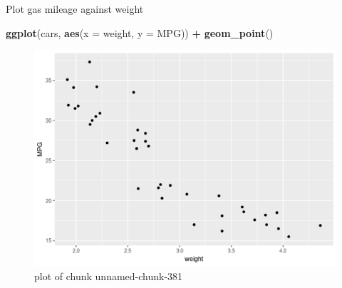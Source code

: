 \documentclass[ignorenonframetext,]{beamer}
\newenvironment{Shaded}{\begin{snugshade}}{\end{snugshade}}
\newcommand{\DataTypeTok}[1]{\textcolor[rgb]{0.13,0.29,0.53}{#1}}
\newcommand{\KeywordTok}[1]{\textcolor[rgb]{0.13,0.29,0.53}{\textbf{#1}}}
\newcommand{\NormalTok}[1]{#1}
\newcommand{\OperatorTok}[1]{\textcolor[rgb]{0.81,0.36,0.00}{\textbf{#1}}}
\newcommand{\StringTok}[1]{\textcolor[rgb]{0.31,0.60,0.02}{#1}}
\begin{document}
\begin{frame}[fragile]{Plot gas mileage against weight}
\protect\hypertarget{plot-gas-mileage-against-weight}{}

\begin{Shaded}
\begin{Highlighting}[]
\KeywordTok{ggplot}\NormalTok{(cars, }\KeywordTok{aes}\NormalTok{(}\DataTypeTok{x =}\NormalTok{ weight, }\DataTypeTok{y =}\NormalTok{ MPG)) }\OperatorTok{+}
\StringTok{  }\KeywordTok{geom_point}\NormalTok{()}
\end{Highlighting}
\end{Shaded}

\begin{figure}
\centering
\includegraphics{figure/unnamed-chunk-381-1.png}
\caption{plot of chunk unnamed-chunk-381}
\end{figure}

\end{frame}
\end{document}
